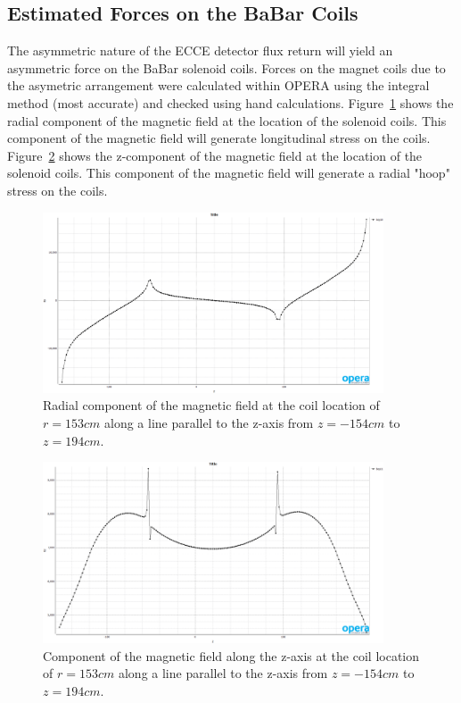 \subsection{Estimated Forces on the BaBar Coils}

The asymmetric nature of the ECCE detector flux return will yield an asymmetric force on the BaBar solenoid coils. Forces on the magnet coils due to the asymetric arrangement were calculated within OPERA using the integral method (most accurate) and checked using hand calculations. Figure~\ref{fig:BRadial} shows the radial component of the magnetic field at the location of the solenoid coils. This component of the magnetic field will generate longitudinal stress on the coils. Figure~\ref{fig:BzThroughCoil} shows the z-component of the magnetic field at the location of the solenoid coils. This component of the magnetic field will generate a radial "hoop" stress on the coils. 

\begin{figure}[h!tbp]
    \centering
    \includegraphics[width=0.9\textwidth]{figs/BRadial.png}
    \caption{Radial component of the magnetic field at the coil location of $r=153cm$ along a line parallel to the z-axis from $z=-154cm$ to $z=194cm$.  }
    \label{fig:BRadial}
\end{figure}

\begin{figure}[h!tbp]
    \centering
    \includegraphics[width=0.9\textwidth]{figs/BzThroughCoil.png}
    \caption{Component of the magnetic field along the z-axis at the coil location of $r=153cm$ along a line parallel to the z-axis from $z=-154cm$ to $z=194cm$.  }
    \label{fig:BzThroughCoil}
\end{figure}

